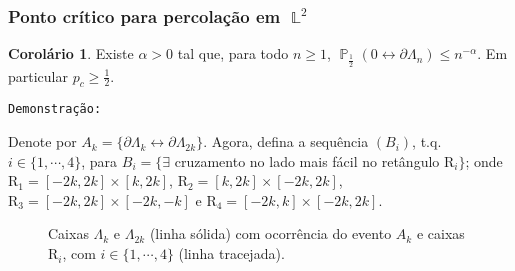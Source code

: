 \documentclass[9pt]{beamer}
\theoremstyle{definition} %
\newtheorem{mycol}{Corolário}
\DeclareMathOperator{\PX}{\mathbb{P}} %
\DeclareMathOperator{\LX}{\mathbb{L}} %
\begin{document}
	\begin{frame}[t]
		\frametitle{Ponto crítico para percolação em $\LX^2$}
		\begin{mycol}\label{col:pc-maior-meio}
			Existe $\alpha > 0$ tal que, para todo $n \geq 1$, $\PX_{\frac{1}{2}}(0 \leftrightarrow \partial \Lambda_n) \leq n^{-\alpha}$. Em particular $p_c \geq \frac{1}{2}$.
		\end{mycol}\pause
		\vspace{-3pt}
		\texttt{Demonstração:}
		\par Denote por $A_k = \{\partial\Lambda_k \leftrightarrow \partial\Lambda_{2k}\}$. Agora, defina a sequência $(B_i)$, t.q. $i \in \{1, \cdots, 4\}$, para $B_i = \{\exists$ cruzamento no lado mais fácil no retângulo $\text{R}_i\}$; onde $\text{R}_1 = [-2k, 2k] \times [k, 2k]$, $\text{R}_2 = [k, 2k] \times [-2k, 2k]$, $\text{R}_3 = [-2k, 2k] \times [-2k, -k]$ e $\text{R}_4 = [-2k, k] \times [-2k, 2k]$.
		
		\begin{figure}
		
		\vspace{-6pt}
		\caption{\justifying Caixas $\Lambda_k$ e $\Lambda_{2k}$ (linha sólida) com ocorrência do evento $A_k$ e caixas $\text{R}_i$, com $i \in \{1, \cdots, 4\}$ (linha tracejada).}
		\label{fig:fig-caixa}
		\end{figure}
	\end{frame}
\end{document}
